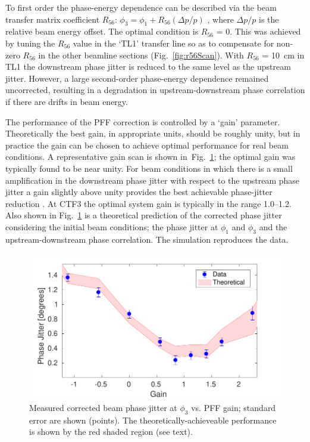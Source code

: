\documentclass[%
 reprint,
 superscriptaddress,
 amsmath,
 amssymb,
 prl,
]{revtex4-1}
\begin{document}
To first order the phase-energy dependence can be described via the beam 
transfer matrix coefficient 
\(R_{56}\):
\(\phi_3 = \phi_1 + R_{56}(\Delta p / p)\)
, where \(\Delta p / p\) is the relative beam energy offset.
The optimal condition is \(R_{56}\) = 0.
This was achieved by tuning the \(R_{56}\) value in the `TL1' transfer line 
so as to compensate for non-zero \(R_{56}\) in the other beamline sections
(Fig.~\ref{fig:r56Scan}). With \(R_{56}\) = 10~cm in TL1 the 
downstream phase jitter is reduced to the same level as the upstream jitter. 
However, a large second-order phase-energy dependence remained uncorrected, 
resulting in a degradation in upstream-downstream phase correlation if there 
are drifts in beam energy.

The performance of the PFF correction is controlled by a ‘gain’ parameter. 
Theoretically the best gain, in appropriate units, should 
be roughly unity, but in practice the gain can be chosen to achieve optimal 
performance for real beam conditions. A representative gain scan is shown 
in~Fig.~\ref{fig:gScan}; the optimal gain was typically found to be near 
unity. For beam conditions in which there is a small amplification in the 
downstream phase jitter with respect to the upstream phase jitter a gain 
slightly above unity provides the best achievable phase-jitter reduction
\cite{RobertsThesis}. At CTF3 the optimal system gain is typically in the range 
1.0--1.2.
Also shown in Fig.~\ref{fig:gScan} is a theoretical prediction of the corrected 
phase jitter considering the initial beam conditions; the phase jitter at 
\(\phi_1\) and \(\phi_3\) and the upstream-downstream phase correlation. The 
simulation reproduces the data.

\begin{figure}
\includegraphics[width=\columnwidth]{figs/gScan}
\caption{\label{fig:gScan}Measured corrected beam  phase jitter at $\phi_3$ vs. 
PFF gain; standard error are shown (points). The theoretically-achieveable 
performance is shown by the red shaded region (see text).}
\end{figure}
\end{document}
